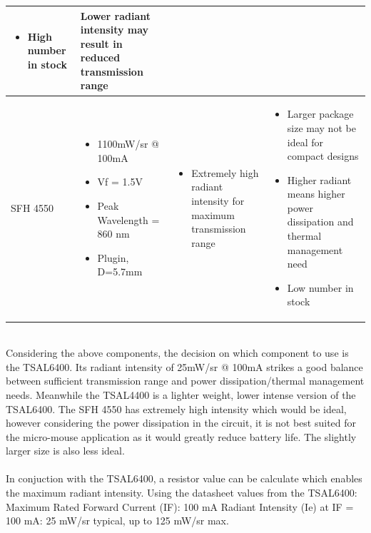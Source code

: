 \documentclass[class=report,11pt,crop=false]{standalone}
\begin{document}
\begin{table}[h]
\begin{center}
\begin{tabular}{|>{\centering\arraybackslash}m{2cm}|m{3.5cm}|m{5cm}|m{6.5cm}|}
\begin{itemize}
      \item High number in stock 
      \end{itemize} &
      Lower radiant intensity may result in reduced transmission range \\
      \hline 
      SFH 4550 & 
      \begin{itemize}
      \item 1100mW/sr @ 100mA 
      \item Vf = 1.5V 
      \item Peak Wavelength = 860 nm 
      \item Plugin, D=5.7mm  
      \end{itemize} &
      \begin{itemize}
      \item Extremely high radiant intensity for maximum transmission range  
      \end{itemize} &
      \begin{itemize}
      \item Larger package size may not be ideal for compact designs 
      \item Higher radiant means higher power dissipation and thermal management need 
      \item Low number in stock
      \end{itemize} \\
      \hline
    \end{tabular}
  \end{center}
\end{table} \\ 
 Considering the above components, the decision on which component to use is the TSAL6400. Its radiant intensity of 25mW/sr @ 100mA strikes a good balance between sufficient transmission range and power dissipation/thermal management needs. Meanwhile the TSAL4400 is a lighter weight, lower intense version of the TSAL6400. The SFH 4550 has extremely high intensity which would be ideal, however considering the power dissipation in the circuit, it is not best suited for the micro-mouse application as it would greatly reduce battery life. The slightly larger size is also less ideal.
\\\\ %
In conjuction with the TSAL6400, a resistor value can be calculate which enables the maximum radiant intensity. Using the datasheet values from the TSAL6400: Maximum Rated Forward Current (IF): 100 mA
Radiant Intensity (Ie) at IF = 100 mA: 25 mW/sr typical, up to 125 mW/sr max.\\
\end{document}
